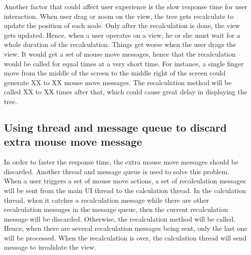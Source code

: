 \documentclass[MSc]{icldt}
\begin{document}
Another factor that could affect user experience is the slow response time for user interaction. When user drag or zoom on the view, the tree gets recalculate to update the position of each node. Only after the recalculation is done, the view gets updated. Hence, when a user operates on a view, he or she must wait for a whole duration of the recalculation. Things get worse when the user drags the view. It would get a set of mouse move messages, hence that the recalculation would be called for equal times at a very short time. For instance, a single finger move from the middle of the screen to the middle right of the screen could generate XX to XX mouse move messages. The recalculation method will be called XX to XX times after that, which could cause great delay in displaying the tree.

    

\subsection{Using thread and message queue to discard extra mouse move message}

In order to faster the response time, the extra mouse move messages should be discarded. Another thread and message queue is used to solve this problem. When a user triggers a set of mouse move actions, a set of recalculation messages will be sent from the main UI thread to the calculation thread. In the calculation thread, when it catches a recalculation message while there are other recalculation messages in the message queue, then the current recalculation message will be discarded. Otherwise, the recalculation method will be called. Hence, when there are several recalculation messages being sent, only the last one will be processed. When the recalculation is over, the calculation thread will send message to invalidate the view.  
\end{document}
